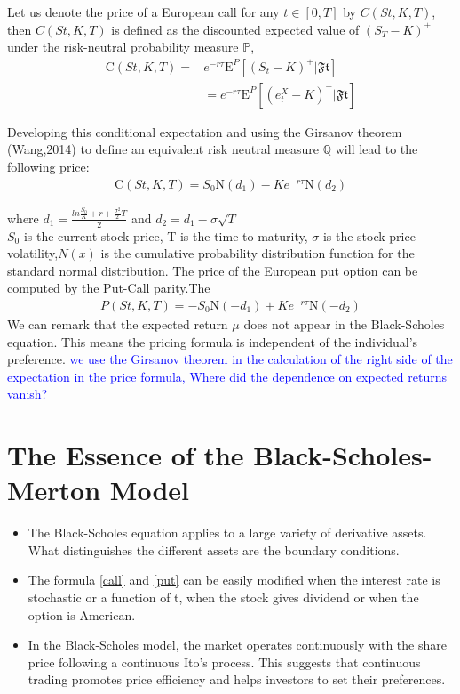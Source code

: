 \documentclass[12pt]{report}
\begin{document}
Let us denote the price of a European call for any $ t \in [0, T]$ by $C(St, K,T)$, then $C(St, K,T)$ is defined as the discounted expected value of $(S_T-K)^+$ under the risk-neutral probability measure $\mathbb{P}$,\\
\begin{align}
\text{C}(St, K,T)=& e^{-r \tau} \text{E}^P[(S_t-K)^+|\mathfrak{Ft}] \nonumber \\ 
&=e^{-r \tau} \text{E}^P[(e^X_t-K)^+|\mathfrak{Ft}] 
\end{align}


Developing this conditional expectation and using the Girsanov theorem (Wang,2014) to define an equivalent risk neutral measure $\mathbb{Q}$ will lead to the following price:
\begin{gather}
\text{C}(St,K,T)= S_0 \text{N}(d_1) - K e^{-r \tau} \text{N}(d_2)
\label{call}
\end{gather}

where $ d_1= \frac{ln\frac{S_0}{K}+r+\frac{\sigma^2}{2}T}{2} $ and $d_2 = d_1-\sigma \sqrt{T} $ \\
$ S_0$ is the current stock price, T is the time to maturity, $\sigma$ is the stock price volatility,$N(x)$ is the cumulative probability distribution function for the standard normal distribution. The price of the European put option can
be computed by the Put-Call parity.The 
\begin{gather}
P(St,K,T)= -S_0 \text{N}(-d_1) + K e^{-r \tau} \text{N}(-d_2)
\label{put}
\end{gather}
We can remark that the expected return $\mu$ does not appear in the Black-Scholes equation. This means the pricing formula is independent of the individual’s preference. 
\textcolor{blue}{we use the Girsanov theorem in the calculation of the right side of the expectation in the price formula, 
Where did the dependence on expected returns vanish? }

\section{The Essence  of the Black-Scholes-Merton Model}
\begin{itemize}

\item The Black-Scholes equation applies to a large variety of derivative assets. What distinguishes the different assets are the boundary conditions.
\item The formula \eqref{call} and \eqref{put} can be easily modified when the interest rate is stochastic or a function of t, when the stock gives dividend or when the option is American.

\item  In the Black-Scholes model, the market operates continuously with the share price following a continuous Ito’s process.  This suggests that continuous trading promotes price efficiency and helps investors to set their preferences.
\end{itemize}
\end{document}
